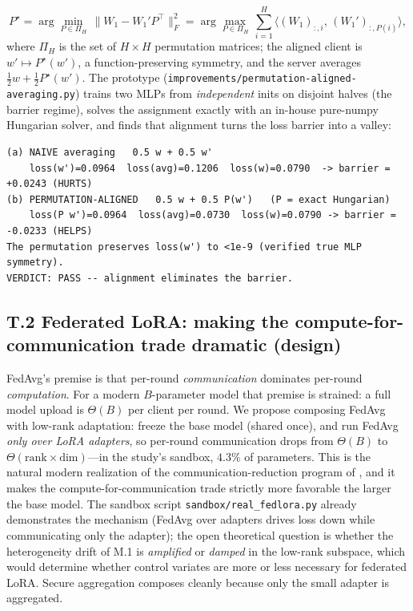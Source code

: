 \documentclass[11pt]{article}
\begin{document}
$$P^\star = \arg\min_{P\in\Pi_H}\, \big\lVert W_1 - W_1' P^\top \big\rVert_F^2 = \arg\max_{P\in\Pi_H}\, \sum_{i=1}^{H} \big\langle (W_1)_{:,i},\,(W_1')_{:,P(i)}\big\rangle,$$
where $\Pi_H$ is the set of $H\times H$ permutation matrices; the aligned client is $w'\mapsto P^\star(w')$, a function-preserving symmetry, and the server averages $\tfrac12 w + \tfrac12 P^\star(w')$. The prototype (\texttt{improvements/permutation-aligned-averaging.py}) trains two MLPs from \emph{independent} inits on disjoint halves (the barrier regime), solves the assignment exactly with an in-house pure-numpy Hungarian solver, and finds that alignment turns the loss barrier into a valley:

\begin{lstlisting}
(a) NAIVE averaging   0.5 w + 0.5 w'
    loss(w')=0.0964  loss(avg)=0.1206  loss(w)=0.0790  -> barrier = +0.0243 (HURTS)
(b) PERMUTATION-ALIGNED   0.5 w + 0.5 P(w')   (P = exact Hungarian)
    loss(P w')=0.0964  loss(avg)=0.0730  loss(w)=0.0790 -> barrier = -0.0233 (HELPS)
The permutation preserves loss(w') to <1e-9 (verified true MLP symmetry).
VERDICT: PASS -- alignment eliminates the barrier.
\end{lstlisting}

\subsection*{T.2 Federated LoRA: making the compute-for-communication trade dramatic (design)}

FedAvg's premise is that per-round \emph{communication} dominates per-round \emph{computation}. For a modern $B$-parameter model that premise is strained: a full model upload is $\Theta(B)$ per client per round. We propose composing FedAvg with low-rank adaptation: freeze the base model (shared once), and run FedAvg \emph{only over LoRA adapters}, so per-round communication drops from $\Theta(B)$ to $\Theta(\text{rank}\times\text{dim})$---in the study's sandbox, $4.3\%$ of parameters. This is the natural modern realization of the communication-reduction program of \citet{konecny2016strategies}, and it makes the compute-for-communication trade strictly more favorable the larger the base model. The sandbox script \texttt{sandbox/real\_fedlora.py} already demonstrates the mechanism (FedAvg over adapters drives loss down while communicating only the adapter); the open theoretical question is whether the heterogeneity drift of M.1 is \emph{amplified} or \emph{damped} in the low-rank subspace, which would determine whether control variates are more or less necessary for federated LoRA. Secure aggregation \citep{bonawitz2017secure} composes cleanly because only the small adapter is aggregated.
\end{document}
